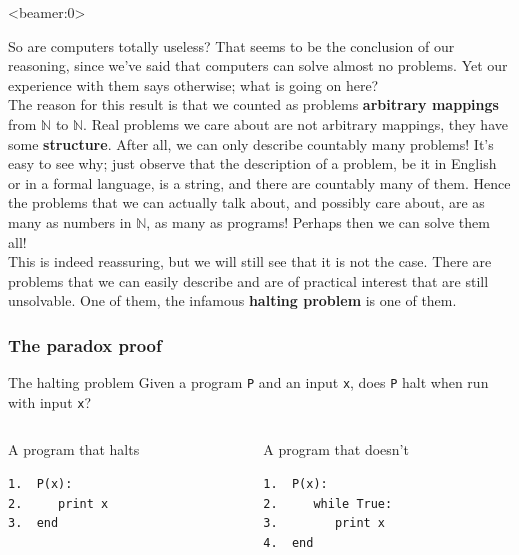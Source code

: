 \documentclass[handout, 12pt]{beamer}
\newcommand{\N}{\mathbb{N}}
\begin{document}
\begin{frame}<beamer:0>

\footnotesize
So are computers totally useless? That seems to be the conclusion of our reasoning, since we've said that computers can solve almost no problems. Yet our experience with them says otherwise; what is going on here?
\\[0.6em]
The reason for this result is that we counted as problems \textbf{arbitrary mappings} from $\N$ to $\N$. Real problems we care about are not arbitrary mappings, they have some \textbf{structure}. After all, we can only describe countably many problems! It's easy to see why; just observe that the description of a problem, be it in English or in a formal language, is a string, and there are countably many of them. Hence the problems that we can actually talk about, and possibly care about, are as many as numbers in $\N$, as many as programs! Perhaps then we can solve them all!
\\[0.6em]
This is indeed reassuring, but we will still see that it is not the case. There are problems that we can easily describe and are of practical interest that are still unsolvable. One of them, the infamous \textbf{halting problem} is one of them.

\end{frame}

\begin{frame}[fragile]

\frametitle{The paradox proof}

\begin{block}{The halting problem}
Given a program \texttt{P} and an input \texttt{x}, does \texttt{P} halt when run with input \texttt{x}?
\end{block}

\pause

\begin{block}{}
\begin{columns}[c] 
\begin{column}{0.4\textwidth}
A program that halts
\begin{verbatim}
1.  P(x):
2.     print x
3.  end  
  
\end{verbatim}
\end{column}
\hspace{-2.3em}\vrule\hspace{2.3em}
\begin{column}{0.4\textwidth}
A program that doesn't
\begin{verbatim}
1.  P(x):
2.     while True:
3.        print x
4.  end
\end{verbatim}
\end{column}
\end{columns}
\end{block}

\end{frame}
\end{document}
